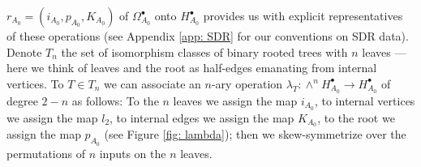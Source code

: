 \documentclass[11pt,a4paper]{amsart}
\theoremstyle{plain} %
\theoremstyle{definition}
\theoremstyle{remark}
\begin{document}
$r_{A_0} = (i_{A_0},p_{A_0},K_{A_0})$ of $\Omega^\bullet_{A_0}$ onto $H^\bullet_{A_0}$ %
provides us with explicit representatives of these operations (see Appendix \ref{app: SDR} for our conventions on SDR data). %
Denote $T_n$ the set of isomorphism classes of binary rooted trees with $n$ leaves --- here we think of leaves and the root as half-edges emanating from internal vertices. To $T\in T_n$ we can associate an $n$-ary operation  $\lambda_T\colon 
\wedge^n H^\bullet_{A_0}
\to H^\bullet_{A_0}$ of degree $2-n$ as follows: To the $n$ leaves we assign the map $i_{A_0}$, to internal vertices we assign the map $l_2$, to internal edges we assign the map %
$K_{A_0}$, to the root we assign the map $p_{A_0}$ (see Figure \ref{fig: lambda});  then we skew-symmetrize over the permutations of $n$ inputs on the $n$ leaves.
\end{document}
